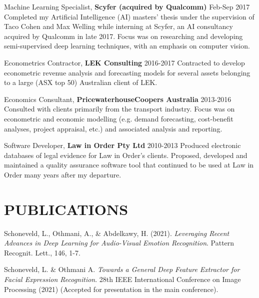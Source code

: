\documentclass[margin]{res}
\begin{document}
\begin{resume}
		{Machine Learning Specialist,} {\bf Scyfer (acquired by Qualcomm)} \hfill Feb-Sep 2017\vspace{1mm}\newline
		Completed my Artificial Intelligence (AI) masters' thesis under the supervision of Taco Cohen and Max Welling while interning at Scyfer, an AI consultancy acquired by Qualcomm in late 2017. Focus was on researching and developing semi-supervised deep learning techniques, with an emphasis on computer vision.
		
		{Econometrics Contractor,} {\bf LEK Consulting} \hfill 2016-2017\vspace{1mm}\newline
		Contracted to develop econometric revenue analysis and forecasting models for several assets belonging to a large (ASX top 50) Australian client of LEK.
		
		{Economics Consultant,} {\bf PricewaterhouseCoopers Australia} \hfill 2013-2016\vspace{1mm}\newline
		Consulted with clients primarily from the transport industry. Focus was on econometric and economic modelling (e.g. demand forecasting, cost-benefit analyses, project appraisal, etc.) and associated analysis and reporting.
		
		{Software Developer,} {\bf Law in Order Pty Ltd} \hfill 2010-2013\vspace{1mm}\newline
		Produced electronic databases of legal evidence for Law in Order's clients. Proposed, developed and maintained a quality assurance software tool that continued to be used at Law in Order many years after my departure.
		
		
		
		\section{PUBLICATIONS}
		
		Schoneveld, L., Othmani, A., \& Abdelkawy, H. (2021). \textit{Leveraging Recent Advances in Deep Learning for Audio-Visual Emotion Recognition}. Pattern Recognit. Lett., 146, 1-7.
		
		Schoneveld, L. \& Othmani A. 
		\textit{Towards a General Deep Feature Extractor for Facial Expression Recognition}. 28th IEEE International Conference on Image Processing (2021) (Accepted for presentation in the main conference).
		

\end{resume}
\end{document}
